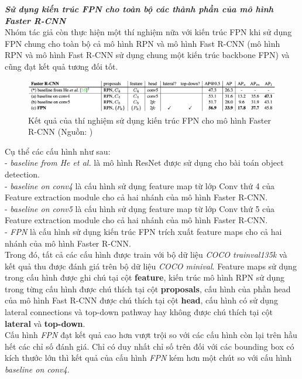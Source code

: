 {    \noindent
    \textbf{\textit{Sử dụng kiến trúc FPN cho toàn bộ các thành phần của mô hình Faster R-CNN}} \\
    Nhóm tác giả còn thực hiện một thí nghiệm nữa với kiến trúc FPN khi sử dụng FPN chung cho toàn bộ cả mô hình RPN và mô hình Fast R-CNN (mô hình RPN và mô hình Fast R-CNN sử dụng chung một kiến trúc backbone FPN) và cũng đạt kết quả tương đối tốt.

    \begin{figure}[H]
        \centering
        \includegraphics[width=12cm] {images/fpn_results_3}
        \caption{Kết quả của thí nghiệm sử dụng kiến trúc FPN cho mô hình Faster R-CNN (Nguồn: \cite{lin2017feature})}
        \label{fig:fpn_results_3}
    \end{figure}

    Cụ thể các cấu hình như sau: \\
    - \textit{baseline from He et al.} là mô hình ResNet được sử dụng cho bài toán object detection. \\
    - \textit{baseline on conv4} là cấu hình sử dụng feature map từ lớp Conv thứ 4 của Feature extraction module cho cả hai nhánh của mô hình Faster R-CNN. \\
    - \textit{baseline on conv5} là cấu hình sử dụng feature map từ lớp Conv thứ 5 của Feature extraction module cho cả hai nhánh của mô hình Faster R-CNN. \\
    - \textit{FPN} là cấu hình sử dụng kiến trúc FPN trích xuất feature maps cho cả hai nhánh của mô hình Faster R-CNN. \\
    Trong đó, tất cả các cấu hình được train với bộ dữ liệu \textit{COCO trainval135k} và kết quả thu được đánh giá trên bộ dữ liệu \textit{COCO minival}.
    Feature maps sử dụng trong cấu hình được ghi chú tại cột \textbf{feature}, kiến trúc mô hình RPN sử dụng trong từng cấu hình được chú thích tại cột \textbf{proposals}, cấu hình của phần head của mô hình Fast R-CNN được chú thích tại cột \textbf{head}, cấu hình có sử dụng lateral connections và top-down pathway hay không được chú thích tại cột \textbf{lateral} và \textbf{top-down}. \\
    Cấu hình \textit{FPN} đạt kết quả cao hơn vượt trội so với các cấu hình còn lại trên hầu hết các chỉ số đánh giá.
    Chỉ có duy nhất chỉ số trên đối với các bounding box có kích thước lớn thì kết quả của cấu hình \textit{FPN} kém hơn một chút so với cấu hình \textit{baseline on conv4}.

}
